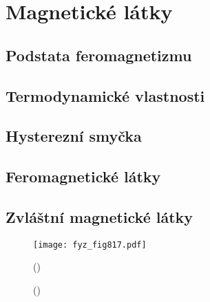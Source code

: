 \setchaptertoc
\chapter{Magnetické látky}\label{fyz:IIchapXXXVII}

  \section{Podstata feromagnetizmu}\label{fyz:IIchapXXXVIIsecI}
  \section{Termodynamické vlastnosti}\label{fyz:IIchapXXXVIIsecII}
  \section{Hysterezní smyčka}\label{fyz:IIchapXXXVIIsecIII}
  \section{Feromagnetické látky}\label{fyz:IIchapXXXVIIsecIV}
  \section{Zvláštní magnetické látky}\label{fyz:IIchapXXXVIIsecV}

    \begin{figure}[ht!] %
      \centering
      \texttt{[image: fyz\_fig817.pdf]}
      \caption{
               (\cite[s.~707]{Feynman02})}
      \label{fyz:fig817}
    \end{figure}

    \begin{figure}[ht!]
      \centering
                     \newline
                     \newline
      \caption{
               (\cite[s.~748]{Feynman02})}
      \label{fyz:fig818}
    \end{figure}

